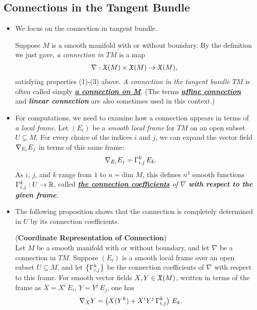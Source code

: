 \documentclass[11pt]{article}
\begin{document}
\subsection{Connections in the Tangent Bundle}
\begin{itemize}
\item We focus on the connection in tangent bundle.
\begin{definition}
Suppose $M$ is a smooth manifold with or without boundary. By the definition we just gave, \emph{a connection in $TM$} is a map
\begin{align*}
\nabla: {\mathfrak X}(M) \times {\mathfrak X}(M) \rightarrow {\mathfrak X}(M),
\end{align*}
satisfying properties (1)-(3) above. \emph{A connection in the tangent bundle $TM$} is often called simply \underline{\emph{\textbf{a connection on M}}}. (The terms \underline{\emph{\textbf{affine connection}}} and \emph{\textbf{linear connection}} are also sometimes used in this context.)
\end{definition}

\item \begin{definition}
For computations, we need to examine how a connection appears in terms of \emph{a local frame}. Let $(E_i)$ be a \emph{smooth local frame} for $TM$ on an open subset $U\subseteq M$. For every choice of the indices $i$ and $j$, we can expand the vector field $\nabla_{E_i}{E_j}$ in terms of this same frame:
\begin{align}
\nabla_{E_i}{E_j} &= \Gamma_{i,j}^{k}\,E_k. \label{eqn: christoffel_symbol_basis}
\end{align} As $i$, $j$, and $k$ range from $1$ to $n = \text{dim }M$, this defines $n^3$ smooth functions $\Gamma_{i,j}^{k}: U \rightarrow {\mathbb R}$, called \emph{\underline{\textbf{the connection coefficients}} of $\nabla$ \textbf{with respect to the given frame}}. 
\end{definition}

\item The following proposition shows that the connection is completely determined in $U$ by its connection coefficients. 
\begin{proposition} (\textbf{Coordinate Representation of Connection}) \citep{lee2018introduction}\\
Let $M$ be a smooth manifold with or without boundary, and let $\nabla$ be a connection in $TM$. Suppose $(E_i)$ is a smooth local frame over an open subset $U\subseteq M$, and let $\left\{\Gamma_{i,j}^{k}\right\}$ be the connection coefficients of $\nabla$ with respect to this frame. For smooth vector fields $X, Y  \in {\mathfrak X}(M)$, written in terms of the frame as $X = X^i\,E_i$, $Y = Y^j\,E_j$, one has
\begin{align}
\nabla_{X}{Y} &= \left(X(Y^k) + X^iY^j\,\Gamma_{i,j}^{k}\right)\,E_k. \label{eqn: connection_represent_christoffel_symbol}
\end{align}
\end{proposition}


\end{itemize}
\end{document}
